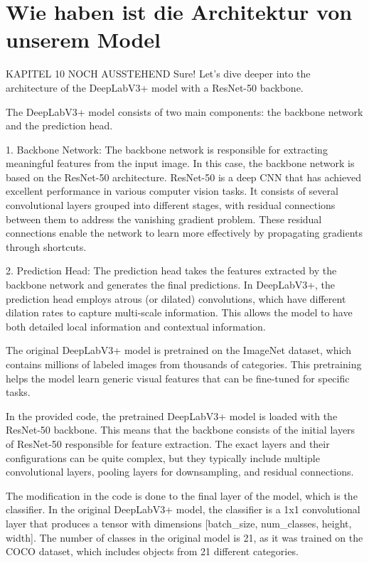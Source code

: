 

\chapter{Wie haben ist die Architektur von unserem Model}
KAPITEL 10 NOCH AUSSTEHEND
Sure! Let's dive deeper into the architecture of the DeepLabV3+ model with a ResNet-50 backbone.

The DeepLabV3+ model consists of two main components: the backbone network and the prediction head.

1. Backbone Network:
The backbone network is responsible for extracting meaningful features from the input image. In this case, the backbone network is based on the ResNet-50 architecture. ResNet-50 is a deep CNN that has achieved excellent performance in various computer vision tasks. It consists of several convolutional layers grouped into different stages, with residual connections between them to address the vanishing gradient problem. These residual connections enable the network to learn more effectively by propagating gradients through shortcuts.

2. Prediction Head:
The prediction head takes the features extracted by the backbone network and generates the final predictions. In DeepLabV3+, the prediction head employs atrous (or dilated) convolutions, which have different dilation rates to capture multi-scale information. This allows the model to have both detailed local information and contextual information.

The original DeepLabV3+ model is pretrained on the ImageNet dataset, which contains millions of labeled images from thousands of categories. This pretraining helps the model learn generic visual features that can be fine-tuned for specific tasks.

In the provided code, the pretrained DeepLabV3+ model is loaded with the ResNet-50 backbone. This means that the backbone consists of the initial layers of ResNet-50 responsible for feature extraction. The exact layers and their configurations can be quite complex, but they typically include multiple convolutional layers, pooling layers for downsampling, and residual connections.

The modification in the code is done to the final layer of the model, which is the classifier. In the original DeepLabV3+ model, the classifier is a 1x1 convolutional layer that produces a tensor with dimensions [batch_size, num_classes, height, width]. The number of classes in the original model is 21, as it was trained on the COCO dataset, which includes objects from 21 different categories.

